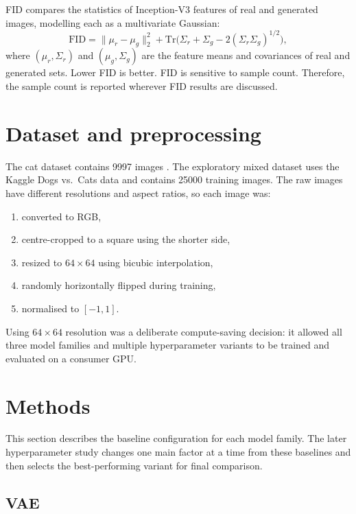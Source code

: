 \documentclass[11pt,a4paper]{article}
\begin{document}
FID \cite{heusel2017fid} compares the statistics of Inception-V3 features of real and generated images, modelling each as a multivariate Gaussian:
\begin{equation}
  \mathrm{FID} =
  \|\mu_r - \mu_g\|_2^2
  + \mathrm{Tr}\!\Big(\Sigma_r + \Sigma_g - 2(\Sigma_r \Sigma_g)^{1/2}\Big),
\end{equation}
where $(\mu_r, \Sigma_r)$ and $(\mu_g, \Sigma_g)$ are the feature means and covariances of real and generated sets.
Lower FID is better.
FID is sensitive to sample count. Therefore, the sample count is reported wherever FID results are discussed.

\section{Dataset and preprocessing}

The cat dataset contains 9997 images \cite{catdataset}.
The exploratory mixed dataset uses the Kaggle Dogs vs.\ Cats data \cite{dogsvscats} and contains 25000 training images.
The raw images have different resolutions and aspect ratios, so each image was:
\begin{enumerate}
  \item converted to RGB,
  \item centre-cropped to a square using the shorter side,
  \item resized to $64\times64$ using bicubic interpolation,
  \item randomly horizontally flipped during training,
  \item normalised to $[-1,1]$.
\end{enumerate}
Using $64\times64$ resolution was a deliberate compute-saving decision: it allowed all three model families and multiple hyperparameter variants to be trained and evaluated on a consumer GPU.

\section{Methods}

This section describes the baseline configuration for each model family.
The later hyperparameter study changes one main factor at a time from these baselines and then selects the best-performing variant for final comparison.

\subsection{VAE}
\end{document}
